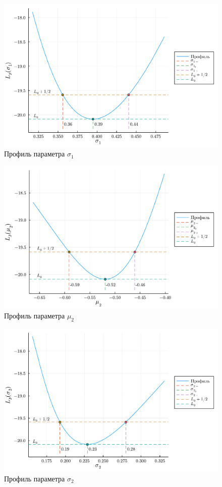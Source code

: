 \documentclass[a4paper, oneside]{article}
\begin{document}
\newpage

\begin{figure}[h!]
  \centering
  \includegraphics[scale=0.5]{σ₁}
  \caption{Профиль параметра $ \sigma_1 $}
\end{figure}

\begin{figure}[h!]
  \centering
  \includegraphics[scale=0.5]{μ₂}
  \caption{Профиль параметра $ \mu_2 $}
\end{figure}

\newpage

\begin{figure}[h!]
  \centering
  \includegraphics[scale=0.5]{σ₂}
  \caption{Профиль параметра $ \sigma_2 $}
\end{figure}
\end{document}
